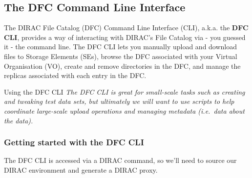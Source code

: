 \subsection{The DFC Command Line Interface}
\label{the-dfc-command-line-interface}
The DIRAC File Catalog (DFC) Command Line Interface (CLI), a.k.a. the
\textbf{DFC CLI}, provides a way of interacting with DIRAC's File
Catalog via - you guessed it - the command line. The DFC CLI lets you
manually upload and download files to Storage Elements (SEs), browse the
DFC associated with your Virtual Organisation (VO), create and remove
directories in the DFC, and manage the replicas associated with each
entry in the DFC.

\begin{infobox}{Using the DFC CLI}
\emph{The DFC CLI is great for small-scale tasks such as creating and tweaking
test data sets, but ultimately we will want to use scripts to help
coordinate large-scale upload operations and managing metadata
(i.e.~data about the data).}
\end{infobox}

\subsubsection{Getting started with the DFC CLI}
\label{getting-started-with-the-dfc-cli}


The DFC CLI is accessed via a DIRAC command, so we'll need to source our
DIRAC environment and generate a DIRAC proxy.

\begin{Shaded}
\begin{Highlighting}[]
\NormalTok{$ } 
\NormalTok{$ } 
 
 
 \NormalTok{[} \NormalTok{information-based output.]}
\end{Highlighting}
\end{Shaded}

